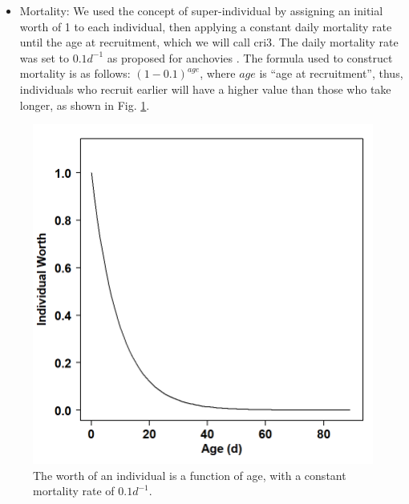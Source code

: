 \begin{itemize}
\item Mortality: We used the concept of super-individual \citep{ScheBave1995, ParrEvan2008} by assigning an initial worth of 1 to each individual, then applying a constant daily mortality rate until the age at recruitment, which we will call \gls{cri3}. The daily mortality rate was set to $0.1 d^{-1}$ as proposed for anchovies \citep{BailHoud1989, Houd2008}. The formula used to construct mortality is as follows: $(1-0.1)^{age}$, where $age$ is ``age at recruitment'', thus, individuals who recruit earlier will have a higher value than those who take longer, as shown in Fig. \ref{Chap3MortalityCurve}.

\end{itemize}

\begin{figure}[ht]
	\includegraphics[width=1.0\textwidth]{figures/Chap3MortalityCurve.png}
	\centering
	\caption{The worth of an individual is a function of age, with a constant mortality rate of $0.1 d^{-1}$.}
	\label{Chap3MortalityCurve}
\end{figure}


